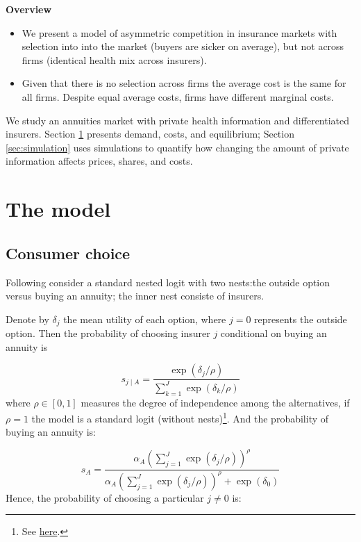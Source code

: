 \documentclass[12pt]{article}
\theoremstyle{plain}
\theoremstyle{plain}
\begin{document}
\textbf{Overview}

\begin{itemize}
    \item We present a model of asymmetric competition in insurance markets with selection into  into the market (buyers are sicker on average), but not across firms (identical health mix across insurers).   
    \item Given that there is no selection across firms the average cost is the same for all firms. Despite equal average costs, firms have different marginal costs. 
\end{itemize}


\hline

\medskip

We study an annuities market with private health information and differentiated insurers. Section  \ref{sec:model} presents demand, costs, and equilibrium; Section  \ref{sec:simulation}  uses simulations to quantify how changing the amount of private information affects prices, shares, and costs.


\section{The model}\label{sec:model}
\subsection{Consumer choice}\label{sec:consumer_choice}

Following \textcite[p. 21 and 22]{hortacsu_structural_2023} consider a standard nested logit with two nests:the outside option versus buying an annuity; the inner nest consiste of insurers. 

Denote by $\delta_j$ the mean utility of each option, where $j =0$ represents the outside option. 
Then the probability of choosing insurer $j$ conditional on buying an annuity is 

\begin{equation}\label{eq:inner_prob}
    s_{j\mid A} = \frac{\exp(\delta_{j} / \rho)}{\sum_{k=1}^{J} \exp(\delta_{k} / \rho)}  
\end{equation}
where $\rho \in [0,1]$ measures the degree of independence among the alternatives, if $\rho =1 $ the model is a standard logit (without nests)\footnote{See \href{https://eml.berkeley.edu/choice2/ch4.pdf}{here}.}. 
And the probability of buying an annuity is: 


\begin{equation}\label{eq:outer_nest}
    s_A = \frac{\alpha_A\left(\sum_{j=1}^J \exp(\delta_j/\rho)\right)^\rho }{\alpha_A\left(\sum_{j=1}^J \exp(\delta_j/\rho)\right)^\rho +  \exp \left(\delta_0 \right)}
\end{equation}
Hence, the probability of choosing a particular $j\neq 0$ is: 
\end{document}

